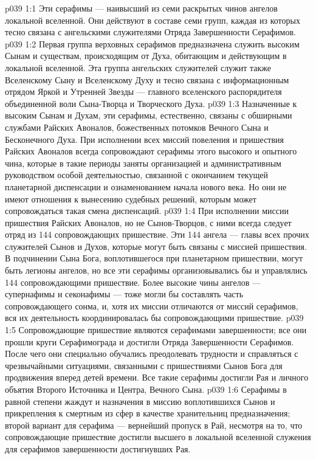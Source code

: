 \vs p039 1:1 Эти серафимы --- наивысший из семи раскрытых чинов ангелов локальной вселенной. Они действуют в составе семи групп, каждая из которых тесно связана с ангельскими служителями Отряда Завершенности Серафимов.
\vs p039 1:2 \pc {}\bibnobreakspace {} Первая группа верховных серафимов предназначена служить высоким Сынам и существам, происходящим от Духа, обитающим и действующим в локальной вселенной. Эта группа ангельских служителей служит также Вселенскому Сыну и Вселенскому Духу и тесно связана с информационным отрядом Яркой и Утренней Звезды --- главного вселенского распорядителя объединенной воли Сына\hyp{}Творца и Творческого Духа.
\vs p039 1:3 Назначенные к высоким Сынам и Духам, эти серафимы, естественно, связаны с обширными службами Райских Авоналов, божественных потомков Вечного Сына и Бесконечного Духа. При исполнении всех миссий повеления и пришествия Райских Авоналов всегда сопровождают серафимы этого высокого и опытного чина, которые в такие периоды заняты организацией и административным руководством особой деятельностью, связанной с окончанием текущей планетарной диспенсации и ознаменованием начала нового века. Но они не имеют отношения к вынесению судебных решений, которым может сопровождаться такая смена диспенсаций.
\vs p039 1:4 \pc {} При исполнении миссии пришествия Райских Авоналов, но не Сынов\hyp{}Творцов, с ними всегда следует отряд из 144 сопровождающих пришествие. Эти 144 ангела --- главы всех прочих служителей Сынов и Духов, которые могут быть связаны с миссией пришествия. В подчинении Сына Бога, воплотившегося при планетарном пришествии, могут быть легионы ангелов, но все эти серафимы организовывались бы и управлялись 144 сопровождающими пришествие. Более высокие чины ангелов --- супернафимы и секонафимы --- тоже могли бы составлять часть сопровождающего сонма, и, хотя их миссии отличаются от миссий серафимов, вся их деятельность координировалась бы сопровождающими пришествие.
\vs p039 1:5 Сопровождающие пришествие являются серафимами завершенности; все они прошли круги Серафимограда и достигли Отряда Завершенности Серафимов. После чего они специально обучались преодолевать трудности и справляться с чрезвычайными ситуациями, связанными с пришествиями Сынов Бога для продвижения вперед детей времени. Все такие серафимы достигли Рая и личного объятия Второго Источника и Центра, Вечного Сына.
\vs p039 1:6 Серафимы в равной степени жаждут и назначения в миссию воплотившихся Сынов и прикрепления к смертным из сфер в качестве хранительниц предназначения; второй вариант для серафима --- вернейший пропуск в Рай, несмотря на то, что сопровождающие пришествие достигли высшего в локальной вселенной служения для серафимов завершенности достигнувших Рая.
